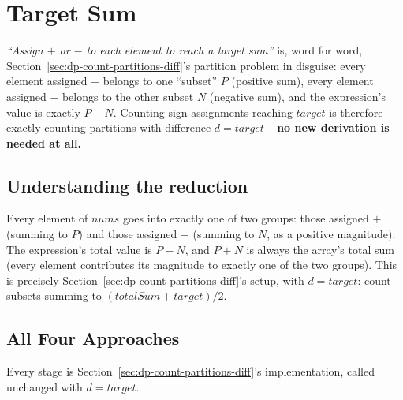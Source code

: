 \section{Target Sum}
\label{sec:dp-target-sum}


\begin{patternbox}
\emph{``Assign $+$ or $-$ to each element to reach a target sum''} is,
word for word, Section~\ref{sec:dp-count-partitions-diff}'s partition
problem in disguise: every element assigned $+$ belongs to one ``subset''
$P$ (positive sum), every element assigned $-$ belongs to the other
subset $N$ (negative sum), and the expression's value is exactly
$P - N$. Counting sign assignments reaching $\textit{target}$ is
therefore exactly counting partitions with difference
$d = \textit{target}$ -- \textbf{no new derivation is needed at all.}
\end{patternbox}

\subsection*{Understanding the reduction}

Every element of $\textit{nums}$ goes into exactly one of two groups:
those assigned $+$ (summing to $P$) and those assigned $-$ (summing to
$N$, as a positive magnitude). The expression's total value is $P-N$,
and $P+N$ is always the array's total sum (every element contributes its
magnitude to exactly one of the two groups). This is precisely
Section~\ref{sec:dp-count-partitions-diff}'s setup, with $d =
\textit{target}$: count subsets summing to $(\textit{totalSum} +
\textit{target})/2$.

\subsection*{All Four Approaches}

Every stage is Section~\ref{sec:dp-count-partitions-diff}'s
implementation, called unchanged with $d = \textit{target}$.

